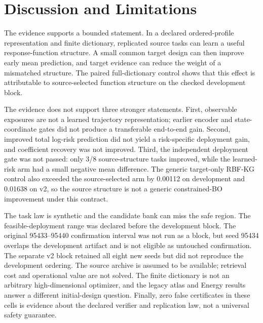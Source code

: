 \section{Discussion and Limitations}\label{sec:mp_discussion}

The evidence supports a bounded statement.  In a declared ordered-profile
representation and finite dictionary, replicated source tasks can learn a
useful response-function structure.  A small common target design can then
improve early mean prediction, and target evidence can reduce the weight of a
mismatched structure.  The paired full-dictionary control shows that this
effect is attributable to source-selected function structure on the checked
development block.

The evidence does not support three stronger statements.  First, observable
exposures are not a learned trajectory representation; earlier encoder and
state-coordinate gates did not produce a transferable end-to-end gain.
Second, improved total log-risk prediction did not yield a risk-specific
deployment gain, and coefficient recovery was not improved.  Third, the
independent deployment gate was not passed: only 3/8 source-structure tasks
improved, while the learned-risk arm had a small negative mean difference.
The generic target-only RBF-KG control also exceeded the source-selected arm by
0.00112 on development and 0.01638 on v2, so the source structure is not a
generic constrained-BO improvement under this contract.

The task law is synthetic and the candidate bank can miss the safe region.
The feasible-deployment range was declared before the development block.  The
original 95433--95440 confirmation interval was not run as a block, but seed
95434 overlaps the development artifact and is not eligible as untouched
confirmation.  The separate v2 block retained all eight new seeds but did not
reproduce the development ordering.  The source
archive is assumed to be available; retrieval cost and operational value are
not solved.  The finite dictionary is not an arbitrary high-dimensional
optimizer, and the legacy atlas and Energy results answer a different
initial-design question.  Finally, zero false certificates in these cells is
evidence about the declared verifier and replication law, not a universal
safety guarantee.
